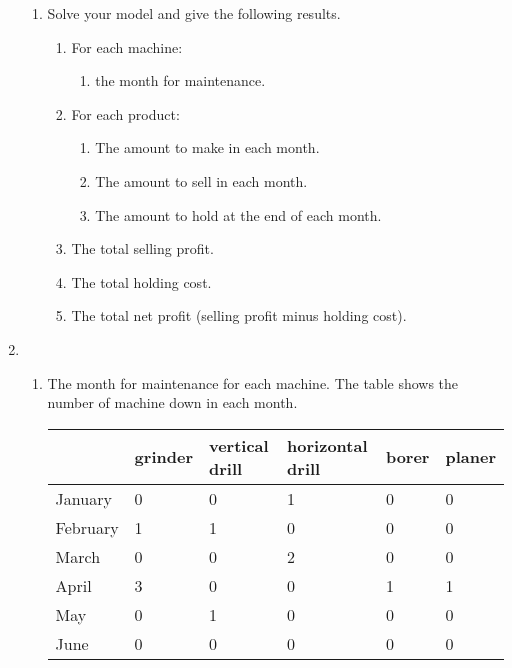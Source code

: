 \documentclass[12pt,a4paper]{article}
\makeatletter
\newtheorem*{solution}{Solution}
\theoremstyle{definition}
\renewenvironment{solution}[1][Solution] {\par\pushQED{\qed}\normalfont\topsep6\p@\@plus6\p@\relax\trivlist\item[\hskip\labelsep\bfseries#1\@addpunct{.}]\ignorespaces}{\popQED\endtrivlist\@endpefalse} \makeatother
\makeatother
\begin{document}
\begin{enumerate}
\begin{enumerate}
    \item
    Solve your model and give the following results.
    \begin{enumerate}
    \item
    For each machine:
    \begin{enumerate}
    \item
    the month for maintenance.
    \end{enumerate}
    \item
    For each product:
    \begin{enumerate}
    \item
    The amount to make in each month.
    \item
    The amount to sell in each month.
    \item
    The amount to hold at the end of each month.
    \end{enumerate}
    \item
    The total selling profit.
    \item
    The total holding cost.
    \item
    The total net profit (selling profit minus holding cost).
    \end{enumerate}
    \end{enumerate}
\begin{solution}
	\begin{enumerate}
		\item The month for maintenance for each machine. The table shows the number of machine down in each month.
		\begin{table}[htbp]
			\scriptsize
			\centering
			\renewcommand\arraystretch{1.1}
			\begin{tabular}{m{0.1\textwidth} m{}<{\centering} m{}<{\centering} m{}<{\centering} m{}<{\centering} m{}<{\centering} }
				\hline
				& \textbf{grinder} & \textbf{vertical drill} & \textbf{horizontal drill} & \textbf{borer} & \textbf{planer}  \\\hline
				January & 0 & 0 & 1 & 0 & 0  \\
				February & 1 & 1 & 0 & 0 & 0  \\
				March & 0 & 0 & 2 & 0 & 0  \\
				April & 3 & 0 & 0 & 1 & 1  \\
				May & 0 & 1 & 0 & 0 & 0  \\
				June & 0 & 0 & 0 & 0 & 0  \\
				\hline
			\end{tabular}

\end{table}
\end{enumerate}
\end{solution}
\end{enumerate}
\end{document}
